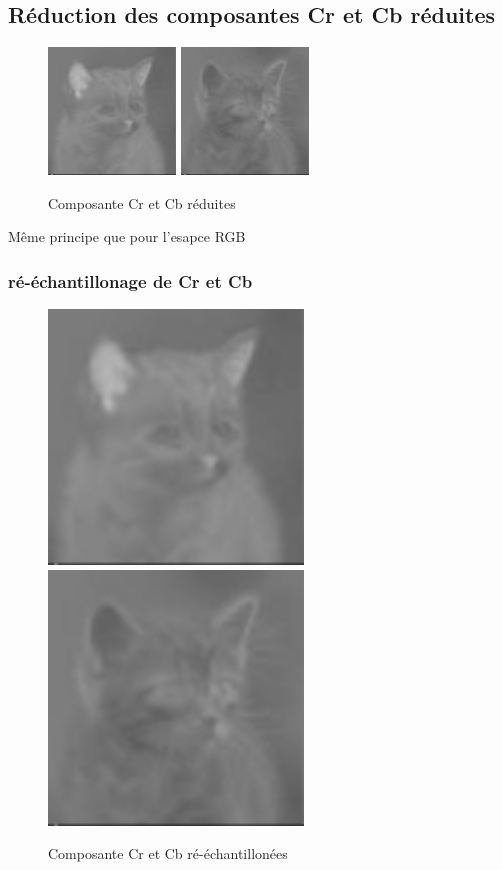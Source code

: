 \documentclass{article}
\begin{document}
\subsection{Réduction des composantes Cr et Cb réduites}
\begin{figure}[h]
\centerline{\includegraphics[scale=1.5]{./rendus/ReduceCr.png} \includegraphics[scale=1.5]{./rendus/ReduceCb.png} }
\caption{Composante Cr et Cb réduites }
\end{figure}

Même principe que pour l'esapce RGB

\newpage
\subsubsection*{ré-échantillonage de Cr et Cb}
\begin{figure}[h]
\centerline{\includegraphics[scale=0.9]{./rendus/ResizeCr.png} \includegraphics[scale=0.9]{./rendus/ResizeCb.png} }
\caption{Composante Cr et Cb ré-échantillonées}
\end{figure}
\end{document}
